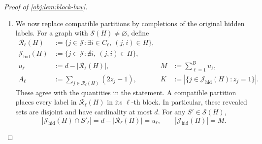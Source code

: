 \documentclass[11pt]{article}
\begin{document}
\begin{proof}[Proof of \cref{obj:lem:block-law}]
\begin{enumerate}
Every \(G(S')\) has \(md\) arrows. The product design yields
\[
\Pr(H,Z=z\mid S=S')
=
\begin{cases}
2^{-n}q^{|H|}(1-q)^{md-|H|},
&S'\in\mathcal S(H),\\
0,&S'\notin\mathcal S(H).
\end{cases}
\]
For a compatible partition, each retained true arrow contributes \(q\), each unretained true arrow contributes \(1-q\), and audit marks on all other pairs integrate to one. For an incompatible partition, an observed arrow outside \(G(S')\) has probability zero. We use the convention \(0^0=1\), so the displayed likelihood also applies at both audit endpoints.

Define
\[
\mu:=\operatorname{Law}(H,Z)
\]
under the actual experiment, averaging over the uniform source partition. On every atom of positive \(\mu\)-mass, the preceding common likelihood and uniform prior give
\[
\Pr(S=S'\mid H,Z=z)
=\frac1{|\mathcal S(H)|}
\qquad(S'\in\mathcal S(H)).
\]
Thus the original conditional record law is the uniform average
\[
\frac1{|\mathcal S(H)|}
\sum_{S'\in\mathcal S(H)}\mathsf K_{S'}(H,z).
\]
When \(\mathcal S(H)\) is empty, assign this expression the zero measure; the corresponding \(\mu\)-atom has mass zero. This convention makes the mixture representation valid over the whole observation space. %

\item We now replace compatible partitions by completions of the original hidden labels. For a graph with \(\mathcal S(H)\ne\varnothing\), define
\[
\begin{aligned}
\mathcal R_\ell(H)
&:=\{j\in\mathcal J:\exists i\in C_\ell,\ (j,i)\in H\},\\
\mathcal J_{\mathrm{hid}}(H)
&:=\{j\in\mathcal J:\nexists i,\ (j,i)\in H\},\\
u_\ell&:=d-|\mathcal R_\ell(H)|,
&
M&:=\sum_{\ell=1}^{B}u_\ell,\\
A_\ell&:=\sum_{j\in\mathcal R_\ell(H)}(2z_j-1),
&
K&:=|\{j\in\mathcal J_{\mathrm{hid}}(H):z_j=1\}|.
\end{aligned}
\]
These agree with the quantities in the statement. A compatible partition places every label in \(\mathcal R_\ell(H)\) in its \(\ell\)-th block. In particular, these revealed sets are disjoint and have cardinality at most \(d\). For any \(S'\in\mathcal S(H)\),
\[
|\mathcal J_{\mathrm{hid}}(H)\cap S'_\ell|
=d-|\mathcal R_\ell(H)|=u_\ell,
\qquad
|\mathcal J_{\mathrm{hid}}(H)|=M.
\]


\end{enumerate}
\end{proof}
\end{document}
